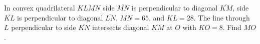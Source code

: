 In convex quadrilateral $KLMN$ side $\overline{MN}$ is perpendicular to diagonal $\overline{KM}$, side $\overline{KL}$ is perpendicular to diagonal $\overline{LN}$, $MN=65$, and $KL=28$. The line through $L$ perpendicular to side $\overline{KN}$ intersects diagonal $\overline{KM}$ at $O$ with $KO=8$. Find $MO$.
